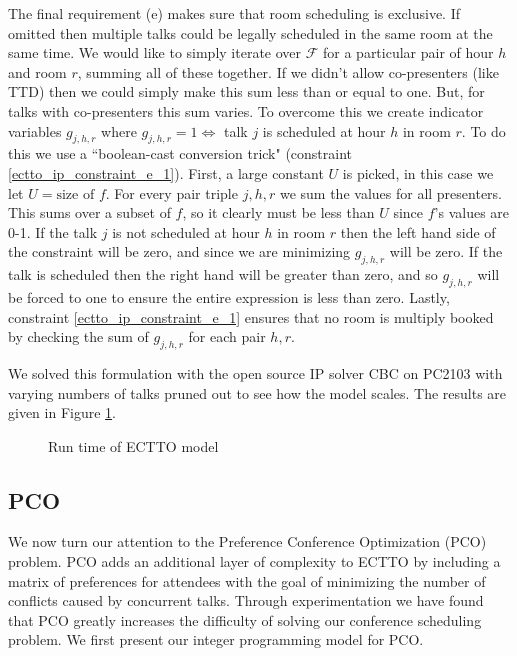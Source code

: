 \documentclass[]{article}
\theoremstyle{definition}
\theoremstyle{remark}
\numberwithin{equation}{section}
\begin{document}
The final requirement (e) makes sure that room scheduling is exclusive. If omitted then multiple talks could be legally scheduled in the same room at the same time. We would like to simply iterate over $\mathcal F$ for a particular pair of hour $h$ and room $r$, summing all of these together. If we didn't allow co-presenters (like TTD) then we could simply make this sum less than or equal to one. But, for talks with co-presenters this sum varies. To overcome this we create indicator variables $g_{j,h,r}$ where $g_{j,h,r}=1 \iff$ talk $j$ is scheduled at hour $h$ in room $r$. To do this we use a ``boolean-cast conversion trick" (constraint \ref{ectto_ip_constraint_e_1}). First, a large constant $U$ is picked, in this case we let $U=\text{size of } f$. For every pair triple $j,h,r$ we sum the values for all presenters. This sums over a subset of $f$, so it clearly must be less than $U$ since $f$'s values are 0-1. If the talk $j$ is not scheduled at hour $h$ in room $r$ then the left hand side of the constraint will be zero, and since we are minimizing $g_{j,h,r}$ will be zero. If the talk is scheduled then the right hand will be greater than zero, and so $g_{j,h,r}$ will be forced to one to ensure the entire expression is less than zero. Lastly, constraint \ref{ectto_ip_constraint_e_1} ensures that no room is multiply booked by checking the sum of $g_{j,h,r}$ for each pair $h,r$.

We solved this formulation with the open source IP solver CBC on PC2103 with varying numbers of talks pruned out to see how the model scales. The results are given in Figure \ref{ectto_run_time}.
\begin{figure}[h!]
	\caption{Run time of ECTTO model}
	\centering
	
	\label{ectto_run_time}
\end{figure}

\subsection{PCO}
We now turn our attention to the Preference Conference Optimization (PCO) problem. PCO adds an additional layer of complexity to ECTTO by including a matrix of preferences for attendees with the goal of minimizing the number of conflicts caused by concurrent talks. Through experimentation we have found that PCO greatly increases the difficulty of solving our conference scheduling problem. We first present our integer programming model for PCO.
\end{document}

